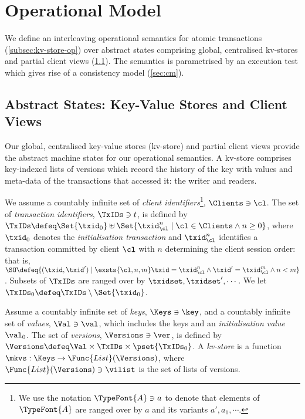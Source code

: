 \section{Operational Model}
\label{sec:model}

We define an interleaving operational semantics  for atomic transactions (\cref{subsec:kv-store-op}) over
abstract states comprising global, centralised kv-stores and partial client views (\cref{subsec:kvstores}). 
The semantics is parametrised by an execution test which gives rise of a consistency model (\cref{sec:cm}).

\subsection{Abstract States: Key-Value Stores and Client Views}
\label{subsec:kvstores}
\label{sec:mkvs-view}
Our global, centralised key-value stores (kv-store) and partial client views
provide the abstract machine states for our operational semantics. A
kv-store comprises key-indexed lists of versions which record
the history of the key with values and meta-data of the
transactions that accessed it: the writer and readers.

We assume a countably infinite set of \emph{client identifiers}\footnote{ We use the notation
 \(\TypeFont{A} \ni a\) to denote that elements of \(\TypeFont{A}\) are ranged over
  by \(a\) and its variants \(a', a_1, \cdots\).},
\(\Clients \ni \cl\).
The set of \emph{transaction identifiers}, \(\TxIDs \ni t\), 
 is defined by
\(\TxIDs \defeq  \Set{\txid_{0}} \uplus \Set{ \txid_{\cl}^{n} \mid \cl \in \Clients \land n \geq 0 }\), 
where  \(\txid_0\) denotes  the  \emph{initialisation transaction}
and \(\txid_{\cl}^{n}\) identifies a transaction committed by client
\(\cl\) with \(n\)  determining  the client session order: that is, 
\(\SO \defeq \{ (\txid, \txid') \mid \exsts{ \cl, n,m } \txid = \txid_{\cl}^{n} \land \allowbreak \txid' = \txid_{\cl}^{m} \land \allowbreak n < m\}\).
Subsets of \(\TxIDs\)  are ranged over by \(\txidset, \txidset', \cdots\). 
We let \(\TxIDs_{0} \defeq \TxIDs \setminus \Set{\txid_0}\). 

\SpaceAboveDef
\begin{definition}[Kv-stores]
\label{def:his_heap}
\label{def:mkvs}
Assume a countably infinite set of \emph{keys}, \(\Keys \ni \key\), 
and a countably infinite set of  \emph{values}, \(\Val \ni \val\), 
which includes the keys and an \emph{initialisation value} \(\val_0\).
The set of \emph{versions}, \(\Versions \ni \ver\), is defined by \(\Versions \defeq \Val \times \TxIDs \times \pset{\TxIDs_{0}}\). 
A \emph{kv-store} 
is a function \(\mkvs: \Keys \to \Func{List}(\Versions)\), 
where \(\Func{List}(\Versions) \ni \vilist\) is the set of lists of versions.
\end{definition}
\SpaceBelowDef

